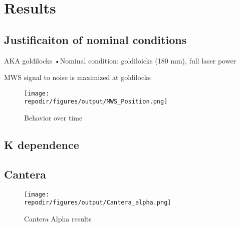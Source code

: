 

\section{Results}

\subsection{Justificaiton of nominal conditions}

AKA goldilocks
•Nominal condition: goldiloicks (180 mm), full laser power

MWS signal to noise is maximized at goldilocks


\begin{figure}[h]
    \texttt{[image: \\repodir/figures/output/MWS\_Position.png]} 
    \caption{Behavior over time}
    \label{fig:efficiency}
\end{figure}

\subsection{K dependence}


\subsection{Cantera}

\begin{figure}[h]
    \texttt{[image: \\repodir/figures/output/Cantera\_alpha.png]} 
    \caption{Cantera Alpha results}
\end{figure}
